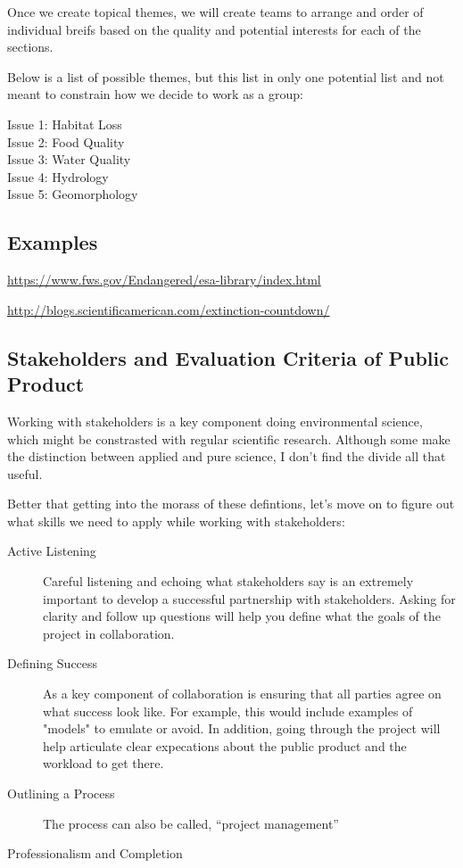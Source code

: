 \documentclass{article}\usepackage[]{graphicx}\usepackage[]{color}
\begin{document}
Once we create topical themes, we will create teams to arrange and order of  individual breifs based on the quality and potential interests for each of the sections.  

Below is a list of possible themes, but this list in only one potential list and not meant to constrain how we decide to work as a group: 

\begin{description}
  \item[Issue 1: Habitat Loss] 
  \item[Issue 2: Food Quality] 
  \item[Issue 3: Water Quality]
  \item[Issue 4: Hydrology]
  \item[Issue 5: Geomorphology]
\end{description}

\subsection{Examples}

\href{https://www.fws.gov/Endangered/esa-library/index.html}{https://www.fws.gov/Endangered/esa-library/index.html}

\href{http://blogs.scientificamerican.com/extinction-countdown/}{http://blogs.scientificamerican.com/extinction-countdown/}

\subsection{Stakeholders and Evaluation Criteria of Public Product}

Working with stakeholders is a key component doing environmental science, which might be constrasted with regular scientific research. Although some make the distinction between applied and pure science, I don't find the divide all that useful. 

Better that getting into the morass of these defintions, let's move on to figure out what skills we need to apply while working with stakeholders:

\begin{description}
  \item[Active Listening] Careful listening and echoing what stakeholders say is an extremely important to develop a successful partnership with stakeholders. Asking for clarity and follow up questions will help you define what the goals of the project in collaboration.
  \item[Defining Success] As a key component of collaboration is ensuring that all parties agree on what success look like. For example, this would include examples of "models" to emulate or avoid. In addition, going through the project will help articulate clear expecations about the public product and the workload to get there.
  \item[Outlining a Process] The process can also be called, ``project management''
  \item[Professionalism and Completion]
\end{description}
\end{document}
